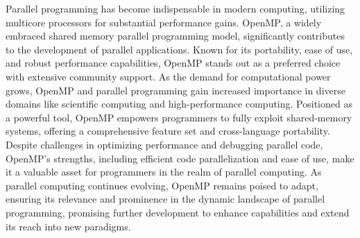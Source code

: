 \documentclass[12pt,conference]{IEEEtran}
\begin{document}
Parallel programming has become indispensable in modern computing, utilizing multicore processors for substantial performance gains. OpenMP, a widely embraced shared memory parallel programming model, significantly contributes to the development of parallel applications. Known for its portability, ease of use, and robust performance capabilities, OpenMP stands out as a preferred choice with extensive community support. As the demand for computational power grows, OpenMP and parallel programming gain increased importance in diverse domains like scientific computing and high-performance computing. Positioned as a powerful tool, OpenMP empowers programmers to fully exploit shared-memory systems, offering a comprehensive feature set and cross-language portability. Despite challenges in optimizing performance and debugging parallel code, OpenMP's strengths, including efficient code parallelization and ease of use, make it a valuable asset for programmers in the realm of parallel computing. As parallel computing continues evolving, OpenMP remains poised to adapt, ensuring its relevance and prominence in the dynamic landscape of parallel programming, promising further development to enhance capabilities and extend its reach into new paradigms.
\end{document}
